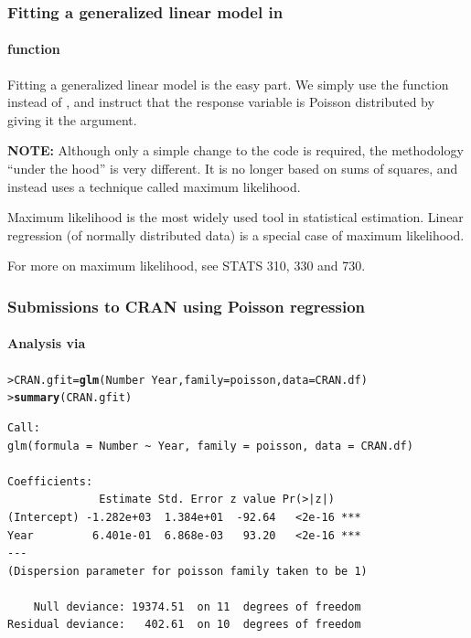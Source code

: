\documentclass{beamer}\usepackage[]{graphicx}\usepackage[]{xcolor}
\makeatletter
\newcommand{\hlopt}[1]{\textcolor[rgb]{0,0,0}{#1}}%
\newcommand{\hlstd}[1]{\textcolor[rgb]{0.345,0.345,0.345}{#1}}%
\newcommand{\hlkwb}[1]{\textcolor[rgb]{0.69,0.353,0.396}{#1}}%
\newcommand{\hlkwc}[1]{\textcolor[rgb]{0.333,0.667,0.333}{#1}}%
\newcommand{\hlkwd}[1]{\textcolor[rgb]{0.737,0.353,0.396}{\textbf{#1}}}%
\newenvironment{kframe}{%
 \def\at@end@of@kframe{}%
 \ifinner\ifhmode%
  \def\at@end@of@kframe{\end{minipage}}%
  \begin{minipage}{\columnwidth}%
 \fi\fi%
 \def\FrameCommand##1{\hskip\@totalleftmargin \hskip-\fboxsep
 \colorbox{shadecolor}{##1}\hskip-\fboxsep
     \hskip-\linewidth \hskip-\@totalleftmargin \hskip\columnwidth}%
 \MakeFramed {\advance\hsize-\width
   \@totalleftmargin\z@ \linewidth\hsize
   \@setminipage}}%
 {\par\unskip\endMakeFramed%
 \at@end@of@kframe}
\newenvironment{knitrout}{}{} %
\makeatother
\begin{document}
\begin{frame}[fragile]
\frametitle{Fitting a generalized linear model in }
\framesubtitle{ function}
Fitting a generalized linear model is the easy part. 
We simply use the  function instead of , 
and instruct  that the response variable is Poisson distributed by
giving it the  argument.

\medskip \medskip
{\bf NOTE:} Although only a simple change to the  code is required,
the methodology ``under the hood'' is very different.
It is no longer based on sums of squares,
and instead uses a technique called maximum likelihood.
\bigskip

Maximum likelihood is the most widely used tool in statistical estimation.
Linear regression (of normally distributed data) is a special case of 
maximum likelihood. 

\medskip 
For more on maximum likelihood, see STATS 310, 330 and 730.
\end{frame}





\begin{frame}[fragile]
\frametitle{Submissions to CRAN using Poisson regression}
\framesubtitle{Analysis via }
\begin{knitrout}\scriptsize
{}\color{fgcolor}\begin{kframe}
\begin{alltt}
\hlstd{> }\hlstd{CRAN.gfit} \hlkwb{=} \hlkwd{glm}\hlstd{(Number} \hlopt{~} \hlstd{Year,} \hlkwc{family} \hlstd{= poisson,} \hlkwc{data} \hlstd{= CRAN.df)}
\hlstd{> }\hlkwd{summary}\hlstd{(CRAN.gfit)}
\end{alltt}
\end{kframe}
\end{knitrout}

\begin{knitrout}\scriptsize
{}\color{fgcolor}\begin{kframe}
\begin{verbatim}
Call:
glm(formula = Number ~ Year, family = poisson, data = CRAN.df)

Coefficients:
              Estimate Std. Error z value Pr(>|z|)    
(Intercept) -1.282e+03  1.384e+01  -92.64   <2e-16 ***
Year         6.401e-01  6.868e-03   93.20   <2e-16 ***
---
(Dispersion parameter for poisson family taken to be 1)

    Null deviance: 19374.51  on 11  degrees of freedom
Residual deviance:   402.61  on 10  degrees of freedom
\end{verbatim}
\end{kframe}
\end{knitrout}

\end{frame}
\end{document}
